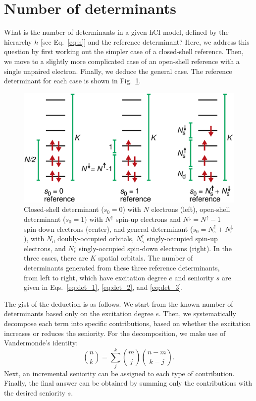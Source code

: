 \documentclass[aip,jcp,reprint,noshowkeys,superscriptaddress]{revtex4-1}
\newcommand{\Na}{N^{\uparrow}}
\newcommand{\Nb}{N^{\downarrow}}
\newcommand{\Nd}{N_\text{d}}
\newcommand{\Nas}{N_\text{s}^{\uparrow}}
\newcommand{\Nbs}{N_\text{s}^{\downarrow}}
\begin{document}
\appendix

\section{Number of determinants}
\label{app:appendix}

What is the number of determinants in a given hCI model, defined by the hierarchy $h$ [see Eq.~\eqref{eq:h}] and the reference determinant?
Here, we address this question by first working out the simpler case of a closed-shell reference.
Then, we move to a slightly more complicated case of an open-shell reference with a single unpaired electron.
Finally, we deduce the general case.
The reference determinant for each case is shown in Fig.~\ref{fig:appendix}.

\begin{figure}[h!]
\includegraphics[width=1.0\linewidth]{determinants_appendix}
\caption{
Closed-shell determinant ($s_0=0$) with $N$ electrons (left),
open-shell determinant ($s_0=1$) with $\Na$ spin-up electrons and $\Nb=\Na-1$ spin-down electrons (center),
and general determinant ($s_0=\Nas+\Nbs$), with $\Nd$ doubly-occupied orbitals, $\Nas$ singly-occupied spin-up electrons, and $\Nbs$ singly-occupied spin-down electrons (right).
In the three cases, there are $K$ spatial orbitals.
The number of determinants generated from these three reference determinants, from left to right, which have excitation degree $e$ and seniority $s$
are given in Eqs.~\eqref{eq:det_1}, \eqref{eq:det_2}, and \eqref{eq:det_3}.
}
\label{fig:appendix}
\end{figure}

The gist of the deduction is as follows.
We start from the known number of determinants based only on the excitation degree $e$.
Then, we systematically decompose each term into specific contributions,
based on whether the excitation increases or reduces the seniority.
For the decomposition, we make use of Vandermonde's identity:
\begin{equation}
	\binom{n}{k} = \sum_{j}^{k} \binom{m}{j} \binom{n-m}{k-j}.
\end{equation}
Next, an incremental seniority can be assigned to each type of contribution.
Finally, the final answer can be obtained by summing only the contributions with the desired seniority $s$.
\end{document}
